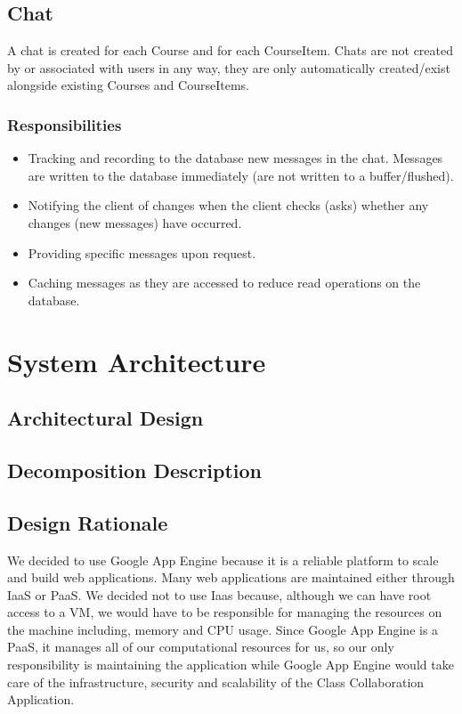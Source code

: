 \documentclass{scrreprt}
\begin{document}
\section{Chat}
A chat is created for each Course and for each CourseItem. Chats are not created by or associated with users in any way, they are only automatically created/exist alongside existing Courses and CourseItems.
\subsection{Responsibilities}
\begin{itemize}
	\item Tracking and recording to the database new messages in the chat. Messages are written to the database immediately (are not written to a buffer/flushed).
	\item Notifying the client of changes when the client checks (asks) whether any changes (new messages) have occurred.
	\item Providing specific messages upon request.
	\item Caching messages as they are accessed to reduce read operations on the database.
\end{itemize}


\chapter{System Architecture}

\section{Architectural Design}

\section{Decomposition Description}

\section{Design Rationale}
\hspace{10mm}We decided to use Google App Engine because it is a reliable platform to scale and build web applications. Many web applications are maintained either through IaaS or PaaS. We decided not to use Iaas because, although we can have root access to a VM, we would have to be responsible for managing the resources on the machine including, memory and CPU usage. Since Google App Engine is a PaaS, it manages all of our computational resources for us, so our only responsibility is maintaining the application while Google App Engine would take care of the infrastructure, security and scalability of the Class Collaboration Application. 
\end{document}
